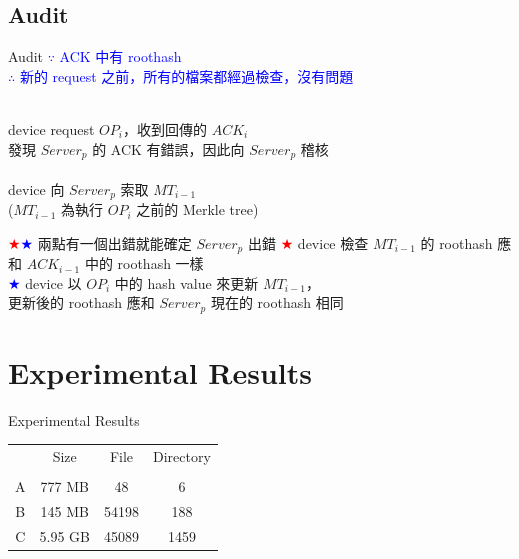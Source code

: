 \documentclass{beamer}
\newcommand{\tab}[1]{\hspace{.1\textwidth}\rlap{#1}}
\begin{document}
\begin{CJK}{UTF8}{bkai}
\subsection{Audit}
\begin{frame}{Audit}
	\textcolor{blue}{$\because$ ACK 中有 roothash\\
	$\therefore$ 新的 request 之前，所有的檔案都經過檢查，沒有問題}\\
	~\\	
	\begin{block}{}
		\centering
		device request $OP_i$，收到回傳的 $ACK_i$\\
		發現 $Server_p$ 的 ACK 有錯誤，因此向 $Server_p$ 稽核\\
		~\\
		device 向 $Server_p$ 索取 $MT_{i-1}$\\
		($MT_{i-1}$ 為執行 $OP_i$ 之前的 Merkle tree)
	\end{block}
	\begin{alertblock}{\textcolor{red}{$\bigstar$}\textcolor{blue}{$\bigstar$} 兩點有一個出錯就能確定 $Server_p$ 出錯}
		\textcolor{red}{$\bigstar$} device 檢查 $MT_{i-1}$ 的 roothash 應和 $ACK_{i-1}$ 中的 roothash 一樣\\
		\textcolor{blue}{$\bigstar$} device 以 $OP_i$ 中的 hash value 來更新 $MT_{i-1}$，\\
		\tab{}更新後的 roothash 應和 $Server_p$ 現在的 roothash 相同
	\end{alertblock}	
\end{frame}

\section{Experimental Results}
\begin{frame}{Experimental Results}
	\begin{table}[]
		\scriptsize
		\centering
		\begin{tabular}{cccc}
			  & Size   & File  & Directory \\
			  &			&		&			\\
			A & 777 MB  & 48    & 6        \\
			B & 145 MB  & 54198 & 188      \\
			C & 5.95 GB & 45089 & 1459     
		\end{tabular}
	   

\end{table}
\end{frame}
\end{CJK}
\end{document}
